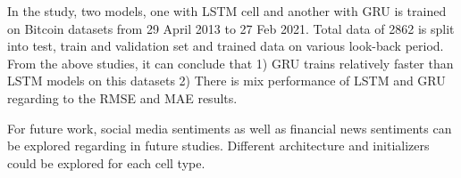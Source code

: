 In the study, two models, one with LSTM cell and another with GRU is trained on Bitcoin datasets from 29 April 2013 to 27 Feb 2021. Total data of 2862 is split into test, train and validation set and trained data on various look-back period. From the above studies, it can conclude that 1) GRU trains relatively faster than LSTM models on this datasets 2) There is mix performance of LSTM and GRU regarding to the RMSE and MAE results.

For future work, social media sentiments as well as financial news sentiments can be explored regarding in future studies. Different architecture and initializers could be explored for each cell type.